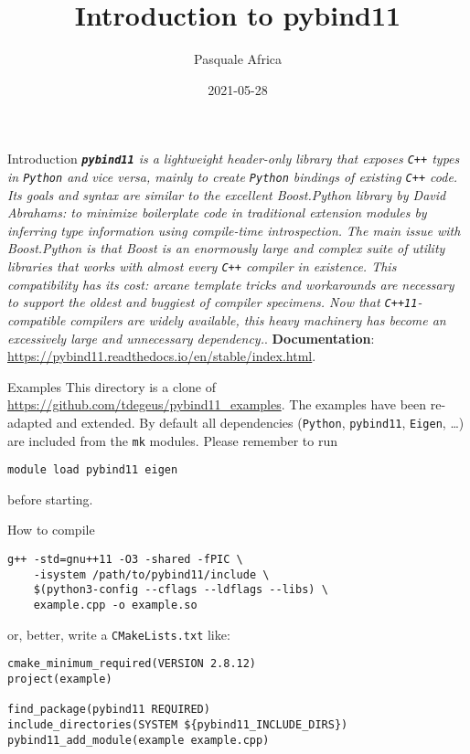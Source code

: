 \documentclass[aspectratio=169,11pt]{beamer}
\title{Introduction to pybind11}
\author{Pasquale Africa}
\institute{Politecnico di Milano}
\date{2021-05-28}
\begin{document}
\begin{frame}[plain]{}
    \maketitle
\end{frame}

\begin{frame}{Introduction}
    \textit{\textbf{\texttt{pybind11}} is a lightweight header-only library that exposes \texttt{C++} types in \texttt{Python} and vice versa, mainly to create \texttt{Python} bindings of existing \texttt{C++} code.}
    \vfill
    \textit{Its goals and syntax are similar to the excellent Boost.Python library by David Abrahams: to minimize boilerplate code in traditional extension modules by inferring type information using compile-time introspection.}
    \vfill
    \textit{The main issue with Boost.Python is that Boost is an enormously large and complex suite of utility libraries that works with almost every \texttt{C++} compiler in existence. This compatibility has its cost: arcane template tricks and workarounds are necessary to support the oldest and buggiest of compiler specimens. Now that \texttt{C++11}-compatible compilers are widely available, this heavy machinery has become an excessively large and unnecessary dependency.}.
    \vfill
    \textbf{Documentation}: \url{https://pybind11.readthedocs.io/en/stable/index.html}.
\end{frame}

\begin{frame}[fragile]{Examples}
    This directory is a clone of \url{https://github.com/tdegeus/pybind11_examples}.
    \vfill
    The examples have been re-adapted and extended. By default all dependencies (\texttt{Python}, \texttt{pybind11}, \texttt{Eigen}, \dots) are included from the \texttt{mk} modules.
    \vfill
    Please remember to run
    \begin{verbatim}
module load pybind11 eigen
    \end{verbatim}
    before starting.
\end{frame}

\begin{frame}[fragile]{How to compile}
    \begin{verbatim}
g++ -std=gnu++11 -O3 -shared -fPIC \
    -isystem /path/to/pybind11/include \
    $(python3-config --cflags --ldflags --libs) \
    example.cpp -o example.so
    \end{verbatim}
    or, better, write a \texttt{CMakeLists.txt} like:
    \begin{verbatim}
cmake_minimum_required(VERSION 2.8.12)
project(example)

find_package(pybind11 REQUIRED)
include_directories(SYSTEM ${pybind11_INCLUDE_DIRS})
pybind11_add_module(example example.cpp)
    \end{verbatim}
\end{frame}
\end{document}
